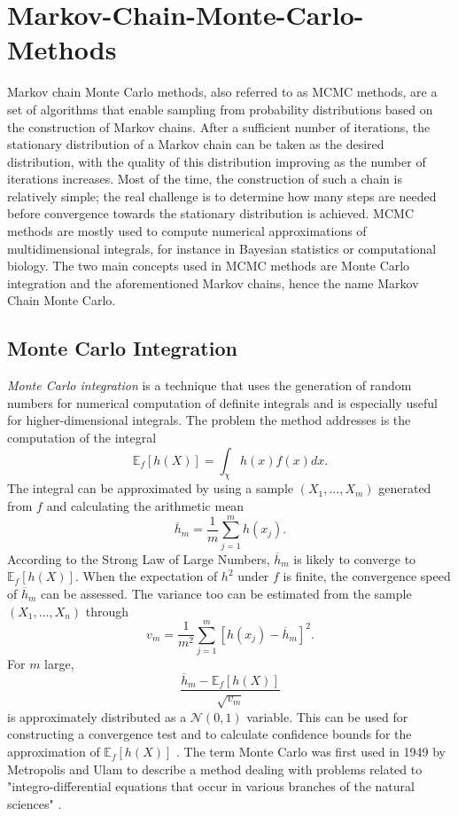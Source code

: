 \section{Markov-Chain-Monte-Carlo-Methods}
Markov chain Monte Carlo methods, also referred to as MCMC methods, are a set of algorithms that enable sampling from probability distributions based on the construction of Markov chains. After a sufficient number of iterations, the stationary distribution of a Markov chain can be taken as the desired distribution, with the quality of this distribution improving as the number of iterations increases. Most of the time, the construction of such a chain is relatively simple; the real challenge is to determine how many steps are needed before convergence towards the stationary distribution is achieved. MCMC methods are mostly used to compute numerical approximations of multidimensional integrals, for instance in Bayesian statistics or computational biology. The two main concepts used in MCMC methods are Monte Carlo integration and the aforementioned Markov chains, hence the name Markov Chain Monte Carlo.
\subsection{Monte Carlo Integration}
\textit{Monte Carlo integration} is a technique that uses the generation of random numbers for numerical computation of definite integrals and is especially useful for higher-dimensional integrals. The problem the method addresses is the computation of the integral
\begin{equation}
    \mathbb{E}_f\left[h\left(X\right)\right]=\int_\chi h(x)f(x)dx.
\end{equation}
The integral can be approximated by using a sample $\left(X_1,...,X_m\right)$ generated from $f$ and calculating the arithmetic mean
\begin{equation}
    \overline{h}_m=\frac{1}{m}\sum_{j=1}^mh\left(x_j\right).
\end{equation}
According to the Strong Law of Large Numbers, $\overline{h}_m$ is likely to converge to $\mathbb{E}_f\left[h\left(X\right)\right]$. When the expectation of $h^2$ under $f$ is finite, the convergence speed of $\overline{h}_m$ can be assessed. The variance too can be estimated from the sample $\left(X_1,...,X_n\right)$ through
\begin{equation}
    v_m=\frac{1}{m^2}\sum_{j=1}^m\left[h\left(x_j\right)-\overline{h}_m\right]^2.
\end{equation}
For $m$ large,
\begin{equation}
    \frac{\overline{h}_m-\mathbb{E}_f\left[h\left(X\right)\right]}{\sqrt{v_m}}
\end{equation}
is approximately distributed as a $\mathcal{N}(0,1)$ variable. This can be used for constructing a convergence test and to calculate confidence bounds for the approximation of $\mathbb{E}_f\left[h\left(X\right)\right]$ \autocite[][83--84]{robert2013monte}. The term Monte Carlo was first used in 1949 by Metropolis and Ulam to describe a method dealing with problems related to "integro-differential equations that occur in various branches of the natural sciences" \autocite[][]{metropolis1949monte}.

